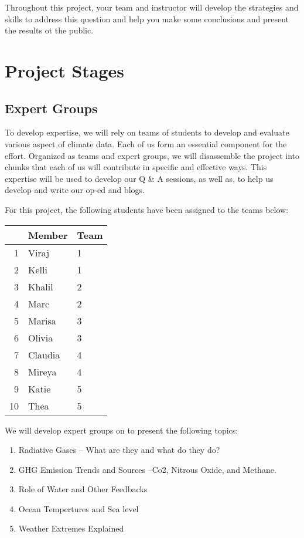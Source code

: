 \documentclass{article}\usepackage[]{graphicx}\usepackage[]{color}
\begin{document}
Throughout this project, your team and instructor will develop the strategies and skills to address this question and help you make some conclusions and present the results ot the public.

\section{Project Stages}

\subsection{Expert Groups}

To develop expertise, we will rely on teams of students to develop and evaluate various aspect of climate data. Each of us form an essential component for the effort. Organized as teams and expert groups, we will disassemble the project into chunks that each of us will contribute in specific and effective ways. This expertise will be used to develop our Q \& A sessions, as well as, to help us develop and write our op-ed and blogs.

For this project, the following students have been assigned to the teams below:

\begin{table}[ht]
\centering
\begin{tabular}{rll}
  \hline
 & Member & Team \\ 
  \hline
1 & Viraj & 1 \\ 
  2 & Kelli & 1 \\ 
  3 & Khalil & 2 \\ 
  4 & Marc & 2 \\ 
  5 & Marisa & 3 \\ 
  6 & Olivia & 3 \\ 
  7 & Claudia & 4 \\ 
  8 & Mireya & 4 \\ 
  9 & Katie & 5 \\ 
  10 & Thea & 5 \\ 
   \hline
\end{tabular}
\end{table}


We will develop expert groups on to present the following topics:

\begin{enumerate}
  \item Radiative Gases -- What are they and what do they do?
  \item GHG Emission Trends and Sources --Co2, Nitrous Oxide, and Methane.
  \item Role of Water and Other Feedbacks
  \item Ocean Tempertures and Sea level
  \item Weather Extremes Explained
\end{enumerate}
\end{document}
